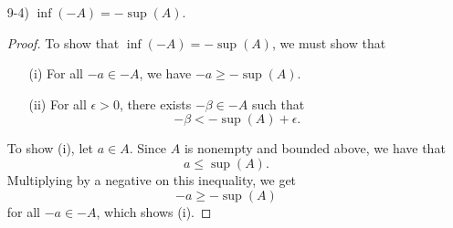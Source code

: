 \documentclass[11pt,a4paper]{article}
\begin{document}
\begin{enumerate}
\begin{enumerate}
\begin{proof}
            Let \( \epsilon > 0 \). Since \( \inf(A)  \) exists, there exists \( \gamma \in A  \) such that   
            \[  \gamma < \inf(A) + \epsilon. \]
            By multiplying by a negative on this inequality, we must have that 
            \[  - \gamma > - \inf(A) - \epsilon \]
            for some \( - \gamma \in -A  \). Thus, we must have that \( \sup(-A) = -\inf(A)  \).
            \end{proof}
        \item[9-4)] \( \inf(-A) = - \sup(A) \).
            \begin{proof}
                To show that \( \inf(-A) = - \sup(A) \), we must show that 
                \begin{enumerate}
                    \item[(i)] For all \( - a \in - A  \), we have \( - a \geq - \sup(A) \). 
                    \item[(ii)] For all \( \epsilon > 0  \), there exists \( - \beta \in - A  \) such that 
                        \[  - \beta < - \sup(A) + \epsilon. \]
                \end{enumerate}
                To show (i), let \( a \in A  \). Since \( A  \) is nonempty and bounded above, we have that  
                \[ a \leq   \sup(A).  \]
                Multiplying by a negative on this inequality, we get
                \[  - a \geq - \sup(A) \]
                for all \( - a \in -A  \), which shows (i). 


\end{proof}
\end{enumerate}
\end{enumerate}
\end{document}
